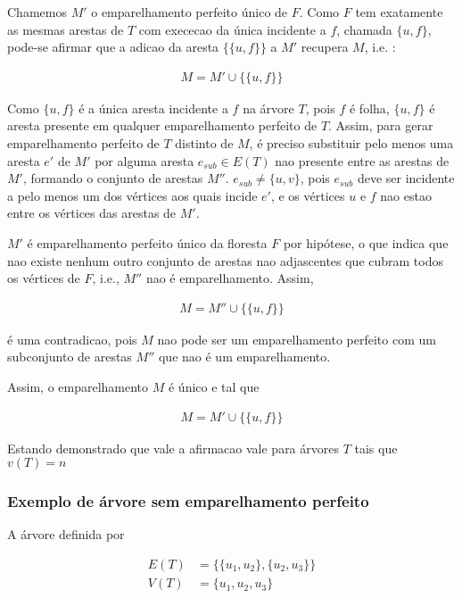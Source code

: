 \documentclass{article}
\begin{document}
Chamemos $M'$ o emparelhamento perfeito único de $F$. Como $F$ tem exatamente as mesmas arestas de $T$ com exececao da única incidente a $f$, chamada $\{u,f\}$, pode-se afirmar que a adicao da aresta $\{\{u,f\}\}$ a $M'$ recupera $M$, i.e. :

\begin{align}
	M = M' \cup \{\{u,f\}\}
\end{align}

Como $\{u,f\}$ é a única aresta incidente a $f$ na árvore $T$, pois $f$ é folha, $\{u,f\}$ é aresta presente em qualquer emparelhamento perfeito de $T$. Assim, para gerar emparelhamento perfeito de $T$ distinto de $M$, é preciso substituir pelo menos uma aresta $e'$ de $M'$ por alguma aresta $e_{sub} \in E(T)$ nao presente entre as arestas de $M'$, formando o conjunto de arestas $M''$.  $e_{sub} \neq \{u,v\}$, pois $e_{sub}$ deve ser incidente a pelo menos um dos vértices aos quais incide $e'$, e os vértices $u$ e $f$ nao estao entre os vértices das arestas de $M'$.

 $M'$ é emparelhamento perfeito único da floresta $F$ por hipótese, o que indica que nao existe nenhum outro conjunto de arestas nao adjascentes que cubram todos os vértices de $F$, i.e., $M''$ nao é emparelhamento. Assim, 


\begin{align}
	M = M'' \cup \{\{u,f\}\}
\end{align}

é uma contradicao, pois $M$ nao pode ser um emparelhamento perfeito com um subconjunto de arestas $M''$ que nao é um emparelhamento. 

Assim, o emparelhamento $M$ é único e tal que

\begin{align}
	M = M' \cup \{\{u,f\}\}
\end{align}

Estando demonstrado que vale a afirmacao vale para árvores $T$ tais que $v(T) = n$


 \subsubsection*{Exemplo de árvore sem emparelhamento perfeito}

 A árvore definida por 
 
 \begin{align*}
 	E(T) &=  \{\{u_1,u_2\},\{u_2,u_3\}    \} \\
 	V(T) &=  \{u_1,u_2,u_3\}
 \end{align*}
 
\end{document}
